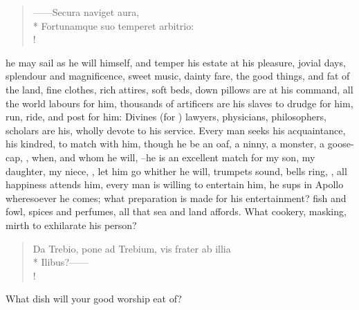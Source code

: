 \begin{latin}
\begin{verse}%
------Secura naviget aura,\\*
Fortunamque suo temperet arbitrio:\\!
\end{verse}%
\end{latin}
he may sail as he will himself, and temper his estate at his pleasure, jovial
days, splendour and magnificence, sweet music, dainty fare, the good things,
and fat of the land, fine clothes, rich attires, soft beds, down pillows are at
his command, all the world labours for him, thousands of artificers are his
slaves to drudge for him, run, ride, and post for him:
Divines (for ) lawyers, physicians,
philosophers, scholars are his, wholly devote to his service. Every man seeks
his acquaintance, his kindred, to match with him, though
he be an oaf, a ninny, a monster, a goose-cap, , when, and whom he will,  --he is an excellent match for my son, my
daughter, my niece, \etc{} , let him go
whither he will, trumpets sound, bells ring, \etc{}, all happiness attends him,
every man is willing to entertain him, he sups in Apollo
wheresoever he comes; what preparation is made for his
entertainment? fish and fowl, spices and perfumes, all
that sea and land affords. What cookery, masking, mirth to exhilarate his
person?

\begin{latin}
\begin{verse}%
Da Trebio, pone ad Trebium, vis frater ab illia\\*
Ilibus?------\\!
\end{verse}%
\end{latin}

What dish will your good worship eat of?


